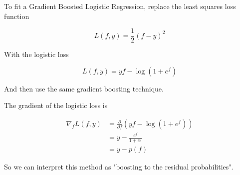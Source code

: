 %
\begin{frame}
To fit a Gradient Boosted Logistic Regression, replace the least squares loss function

$$ L(f, y) = \frac{1}{2} \left(f - y \right)^2 $$

With the logistic loss

$$ L(f, y) = y f - \log(1 + e^f) $$

And then use the same gradient boosting technique.

\end{frame}
%
\begin{frame}
The gradient of the logistic loss is

\begin{align*}
\nabla_f L(f, y) &= \frac{\partial}{\partial f} \left( y f - \log(1 + e^f) \right) \\
&= y - \frac{e^f}{1 + e^f} \\
&= y - p(f)
\end{align*}

So we can interpret this method as "boosting to the residual probabilities".
\end{frame}
%

